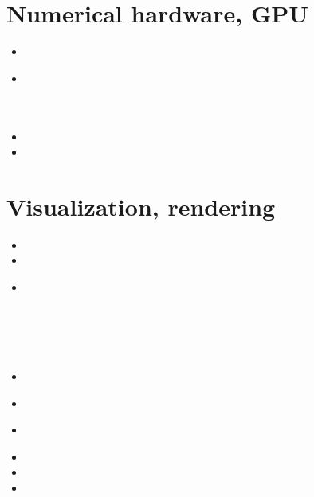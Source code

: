 \section{Numerical hardware, GPU}
\label{sec:topics:hardware}

\begin{scriptsize}
\begin{itemize}
\item[\twothousandsix]
\item[\twothousandthirteen]
 \\
 \\
 \\
\item[\twothousandfourteen]
\item[\twothousandfifteen]
\end{itemize}
\end{scriptsize}

\section{Visualization, rendering}

\begin{scriptsize}
\begin{itemize}
\item[\twothousandfour] 
\item[\twothousandfive] 
\item[\twothousandeight] 
 \\
 \\
 \\
 \\
 \\
\item[\twothousandtwelve] 
 \\
\item[\twothousandfifteen] 
\item[\twothousandseventeen] 
 \\
\item[\twothousandeighteen] 
\item[\twothousandnineteen] 
\item[\twothousandtwenty] 
\end{itemize}
\end{scriptsize}




